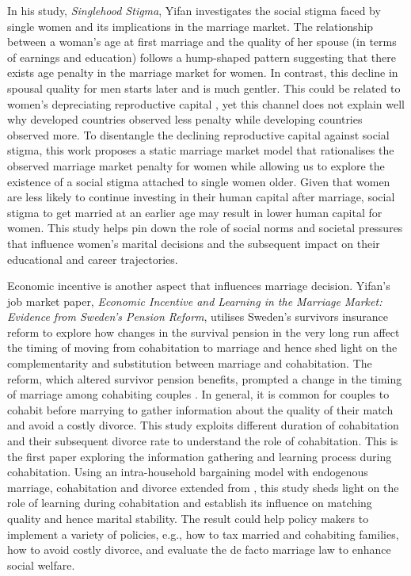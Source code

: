 \documentclass[12pt, letterpaper]{article}
\begin{document}
In his study, \textit{Singlehood Stigma}, Yifan investigates the social stigma faced by single women and its implications in the marriage market. The relationship between a woman's age at first marriage and the quality of her spouse (in terms of earnings and education) follows a hump-shaped pattern suggesting that there exists age penalty in the marriage market for women. In contrast, this decline in spousal quality for men starts later and is much gentler. This could be related to women’s depreciating reproductive capital \citep{Low2023}, yet this channel does not explain well why developed countries observed less penalty while developing countries observed more. To disentangle the declining reproductive capital against social stigma, this work proposes a static marriage market model that rationalises the observed marriage market penalty for women while allowing us to explore the existence of a social stigma attached to single women older. Given that women are less likely to continue investing in their human capital after marriage, social stigma to get married at an earlier age may result in lower human capital for women. This study helps pin down the role of social norms and societal pressures that influence women's marital decisions and the subsequent impact on their educational and career trajectories. 


Economic incentive is another aspect that influences marriage decision. Yifan's job market paper, \textit{Economic Incentive and Learning in the Marriage Market: Evidence from Sweden’s Pension Reform}, utilises Sweden's survivors insurance reform to explore how changes in the survival pension in the very long run affect the timing of moving from cohabitation to marriage and hence shed light on the complementarity and substitution between marriage and cohabitation. The reform, which altered survivor pension benefits, prompted a change in the timing of marriage among cohabiting couples \citep{Persson2020}. In general, it is common for couples to cohabit before marrying to gather information about the quality of their match and avoid a costly divorce.  This study exploits different duration of cohabitation and their subsequent divorce rate to understand the role of cohabitation. This is the first paper exploring the information gathering and learning process during cohabitation. Using an intra-household bargaining model with endogenous marriage, cohabitation and divorce extended from \cite{Voena2015}, this study sheds light on the role of learning during cohabitation and establish its influence on matching quality and hence marital stability. The result could help policy makers to implement a variety of policies, e.g., how to tax married and cohabiting families, how to avoid costly divorce, and evaluate the de facto marriage law to enhance social welfare.
\end{document}

